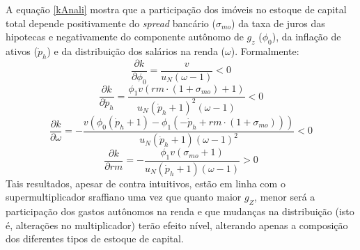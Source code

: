 A equação \ref{kAnali} mostra que a participação dos imóveis no estoque de capital total depende 
positivamente do \textit{spread} bancário ($\sigma_{mo}$) da taxa de juros das hipotecas e 
negativamente do componente autônomo de $g_z$ ($\phi_0$), da inflação de ativos ($\dot p_h$) e da distribuição dos salários na renda ($\omega$). Formalmente:
\begin{equation}
\frac{\partial k}{\partial \phi_0} = \frac{v}{u_N \left(\omega - 1\right)} < 0
\end{equation}
\begin{equation}
\frac{\partial k}{\partial \dot p_h} = \frac{\phi_{1} v \left(rm\cdot(1+\sigma_{mo}) + 1\right)}{u_N \left(\dot p_h + 1\right)^{2} \left(\omega - 1\right)} < 0
\end{equation}
\begin{equation}
\frac{\partial k}{\partial \omega} = - \frac{v \left(\phi_{0} \left(\dot p_h + 1\right) - \phi_{1} \left(- \dot p_h + rm\cdot(1 + \sigma_{mo})\right)\right)}{u_N \left(\dot p_h + 1\right) \left(\omega - 1\right)^{2}} < 0
\end{equation}
\begin{equation}
\frac{\partial k}{\partial rm} = - \frac{\phi_{1} v \left(\sigma_{mo} + 1\right)}{u_N \left(\dot p_h + 1\right) \left(\omega - 1\right)} > 0
\end{equation}
Tais resultados, apesar de contra intuitivos, estão em linha com o supermultiplicador sraffiano uma vez que quanto maior $g_Z$, menor será a participação dos gastos autônomos na renda e que mudanças na distribuição (isto é, alterações no multiplicador) terão efeito nível, alterando apenas a composição dos diferentes tipos de estoque de capital. 



\begin{comment}
Etapas da solução analítica
$$
u_t = - \frac{k v \left(\phi_{0} - \phi_{1} \left(-1 + \frac{rm\cdot(1+\sigma_{mo})}{\dot p_h + 1}\right)\right)}{\left(1 - k\right) \left(\omega - 1 + \frac{v \left(\phi_{0} - \phi_{1} \left(-1 + \frac{rm\cdot(1+\sigma_{mo})}{\dot p_h + 1}\right)\right)}{u_N}\right)}
$$
$$
\frac{k}{1 - k} = \frac{u_N \left(- \omega \left(\dot p_h + 1\right) + \dot p_h + 1\right) - v \left(\phi_{0} \left(\dot p_h + 1\right) - \phi_{1} \left(- \dot p_h + rm + \sigma_{mo}\right)\right)}{v \left(\phi_{0} \left(\dot p_h + 1\right) - \phi_{1} \left(- \dot p_h + rm + \sigma_{mo}\right)\right)}
$$
Por fim, resolvendo para $k$:
$$
k = \frac{u_N \left(- \omega \left(\dot p_h + 1\right) + \dot p_h + 1\right) - v \left(\phi_{0} \left(\dot p_h + 1\right) - \phi_{1} \left(- \dot p_h + rm + \sigma_{mo}\right)\right)(1-R)}{u_N \left(- \omega \left(\dot p_h + 1\right) + \dot p_h + 1\right)}
$$
\end{comment}